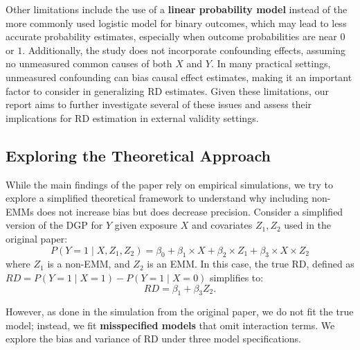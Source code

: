 \documentclass[12pt,oneside]{amsart}
\theoremstyle{definition}
\theoremstyle{remark}
\numberwithin{equation}{section}
\begin{document}
Other limitations include the use of a \textbf{linear probability model} instead of the more commonly used logistic model for binary outcomes, which may lead to less accurate probability estimates, especially when outcome probabilities are near $0$ or $1$. Additionally, the study does not incorporate confounding effects, assuming no unmeasured common causes of both \(X\) and \(Y\). In many practical settings, unmeasured confounding can bias causal effect estimates, making it an important factor to consider in generalizing RD estimates. Given these limitations, our report aims to further investigate several of these issues and assess their implications for RD estimation in external validity settings.


\subsection{Exploring the Theoretical Approach}
While the main findings of the paper rely on empirical simulations, we try to explore a simplified theoretical framework to understand why including non-EMMs does not increase bias but does decrease precision. Consider a simplified version of the DGP for $Y$ given exposure \( X \) and covariates \( Z_1, Z_2 \) used in the original paper:
\begin{equation}
    P(Y = 1 \mid X, Z_1, Z_2) = \beta_0 + \beta_1 \times X + \beta_2 \times Z_1 + \beta_3 \times X \times Z_2
\end{equation}
where \( Z_1 \) is a non-EMM, and \( Z_2 \) is an EMM. In this case, the true RD, defined as $RD = P(Y = 1 \mid X = 1) - P(Y = 1 \mid X = 0)$ simplifies to:
\begin{equation}
    RD = \beta_1 + \beta_3 Z_2.
\end{equation}

However, as done in the simulation from the original paper, we do not fit the true model; instead, we fit \textbf{misspecified models} that omit interaction terms. We explore the bias and variance of RD under three model specifications.
\end{document}
